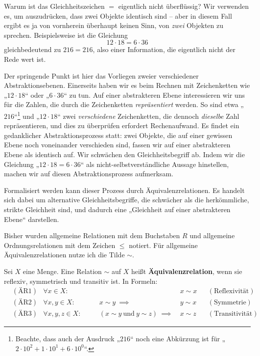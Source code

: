 \begin{bem} \label{aequirelphilo}
    Warum ist das Gleichheitszeichen $=$ eigentlich nicht überflüssig? Wir verwenden es, um auszudrücken, dass zwei Objekte identisch sind -- aber in diesem Fall ergibt es ja von vornherein überhaupt keinen Sinn, von \emph{zwei} Objekten zu sprechen. Beispielsweise ist die Gleichung
        \[ 12\cdot 18 = 6\cdot 36 \]
    gleichbedeutend zu $216=216$, also einer Information, die eigentlich nicht der Rede wert ist.
    
    Der springende Punkt ist hier das Vorliegen zweier verschiedener Abstraktionsebenen. Einerseits haben wir es beim Rechnen mit Zeichenketten wie „$12\cdot 18$“ oder „$6\cdot 36$“ zu tun. Auf einer abstrakteren Ebene interessieren wir uns für die Zahlen, die durch die Zeichenketten \emph{repräsentiert} werden. So sind etwa „$216$“\footnote{Beachte, dass auch der Ausdruck „$216$“ noch eine Abkürzung ist für „$2\cdot 10^2 + 1\cdot 10^1 + 6 \cdot 10^0$“.} und „$12\cdot 18$“ zwei \emph{verschiedene} Zeichenketten, die dennoch \emph{dieselbe} Zahl repräsentieren, und dies zu überprüfen erfordert Rechenaufwand. Es findet ein gedanklicher Abstraktionsprozess statt: zwei Objekte, die auf einer gewissen Ebene noch voneinander verschieden sind, fassen wir auf einer abstrakteren Ebene als identisch auf. Wir schwächen den Gleichheitsbegriff ab. Indem wir die Gleichung „$12\cdot 18=6\cdot 36$“ als nicht-selbstverständliche Aussage hinstellen, machen wir auf diesen Abstraktionsprozess aufmerksam.
    
    Formalisiert werden kann dieser Prozess durch Äquivalenzrelationen. Es handelt sich dabei um alternative Gleichheitsbegriffe, die schwächer als die herkömmliche, strikte Gleichheit sind, und dadurch eine „Gleichheit auf einer abstrakteren Ebene“ darstellen.

    Bisher wurden allgemeine Relationen mit dem Buchstaben $R$ und allgemeine Ordnungsrelationen mit dem Zeichen $\le$ notiert. Für allgemeine Äquivalenzrelationen nutze ich die Tilde $\sim$.
\end{bem}


\begin{defin}[Äquivalenzrelation] \label{def:aequirel} 
    Sei $X$ eine Menge. Eine Relation $\sim$ auf $X$ heißt \textbf{Äquivalenzrelation}, wenn sie reflexiv, symmetrisch und transitiv ist. In Formeln:
    \begin{align*}
        & (\text{ÄR1}) & \forall x\in X:&&\quad & x\sim x && (\text{Reflexivität}) \\
        & (\text{ÄR2}) & \forall x,y\in X:&&\quad x\sim y\ \implies\ & y\sim x && (\text{Symmetrie}) \\
        & (\text{ÄR3}) & \forall x,y,z\in X:&&\quad (x\sim y\ \text{und}\ y\sim z)\ \implies\ & x\sim z && (\text{Transitivität})
    \end{align*}
\end{defin}


